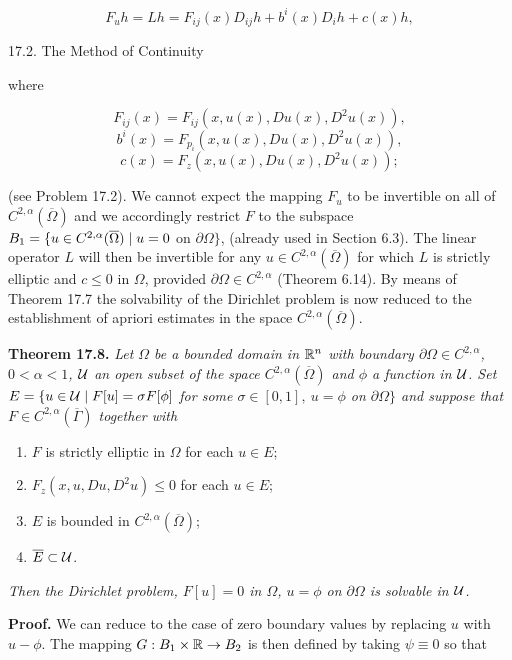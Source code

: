 \begin{equation}
\tag{17.22}
F_{u}h=Lh=F_{ij}(x)D_{ij}h+b^{i}(x)D_{i}h+c(x)h,
\end{equation}


17.2. The Method of Continuity

where

\[
F_{ij}(x)=F_{ij}(x,u(x),Du(x),D^2u(x)),
\]
\[
b^i(x)=F_{p_i}(x,u(x),Du(x),D^2u(x)),
\]
\[
c(x)=F_z(x,u(x),Du(x),D^2u(x));
\]

(see Problem 17.2). We cannot expect the mapping $F_u$ to be invertible on all of
$C^{2,\alpha}(\overline{\Omega})$ and we accordingly restrict $F$ to the subspace $B_1
=\{u\in C^{2,\alpha}(\overline{\Omega})\mid u=0$ on
$\partial\Omega\}$, (already used in Section 6.3). The linear operator $L$ will then be invertible for
any $u\in C^{2,\alpha}(\overline{\Omega})$ for which $L$ is strictly elliptic and $c\le 0$ in $\Omega$, provided $\partial\Omega\in C^{2,\alpha}$
(Theorem 6.14). By means of Theorem 17.7 the solvability of the Dirichlet problem
is now reduced to the establishment of apriori estimates in the space $C^{2,\alpha}(\overline{\Omega})$.

\medskip

\noindent\textbf{Theorem 17.8.} \textit{Let $\Omega$ be a bounded domain in $\mathbb{R}^n$ with boundary $\partial\Omega\in C^{2,\alpha}$, $0<\alpha<1$, $\mathcal{U}$ an open subset of the space $C^{2,\alpha}(\overline{\Omega})$ and $\phi$ a function in $\mathcal{U}$. Set $E=\{u\in\mathcal{U}\mid F[u]=\sigma F[\phi]$ for some $\sigma\in[0,1],\ u=\phi$ on $\partial\Omega\}$ and suppose that $F\in C^{2,\alpha}(\overline{\Gamma})$ together with}

\begin{enumerate}
\item[(i)] $F$ is strictly elliptic in $\Omega$ for each $u\in E$;
\item[(ii)] $F_z(x,u,Du,D^2u)\le 0$ for each $u\in E$;
\item[(iii)] $E$ is bounded in $C^{2,\alpha}(\overline{\Omega})$;
\item[(iv)] $\overline{E}\subset \mathcal{U}$.
\end{enumerate}

\noindent \textit{Then the Dirichlet problem, $F[u]=0$ in $\Omega$, $u=\phi$ on $\partial\Omega$ is solvable in $\mathcal{U}$.}

\medskip

\noindent\textbf{Proof.} We can reduce to the case of zero boundary values by replacing $u$ with
$u-\phi$. The mapping $G:B_1\times \mathbb{R}\to B_2$ is then defined by taking $\psi\equiv 0$ so that

